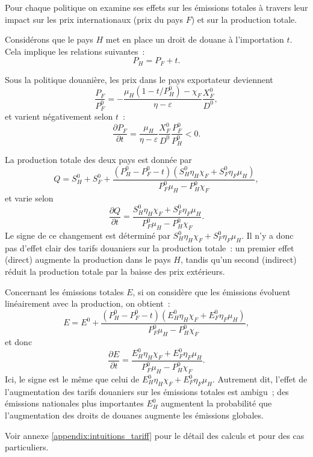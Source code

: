 Pour chaque politique on examine ses effets sur les émissions totales à travers leur impact sur les prix internationaux (prix du pays $F$) et sur la production totale.

Considérons que le pays $H$ met en place un droit de douane à l'importation $t$. Cela implique les relations suivantes~:
$$
    P_H = P_F + t.
$$

Sous la politique douanière, les prix dans le pays exportateur deviennent
$$
    \frac{P_F}{P_F^0} = -\frac{\mu_H (1 - t/P_H^0) - \chi_F}{\eta - \varepsilon}\frac{X_F^0}{D^0},
$$
et varient négativement selon $t$~:
$$
    \frac{\partial P_F}{\partial t} = \frac{\mu_H}{\eta - \varepsilon} \frac{X_F^0}{D^0} \frac{P_F^0}{P_H^0} < 0.
$$

La production totale des deux pays est donnée par
$$
    Q = S_H^0 + S_F^0 + \frac{(P_H^0 - P_F^0 - t)(S_H^0 \eta_H \chi_F + S_F^0 \eta_F \mu_H)}{P_F^0 \mu_H - P_H^0 \chi_F},
$$
et varie selon
$$
    \frac{\partial Q}{\partial t} = \frac{S_H^0 \eta_H \chi_F + S_F^0 \eta_F \mu_H}{P_F^0 \mu_H - P_H^0 \chi_F}.
$$
Le signe de ce changement est déterminé par $S_H^0 \eta_H \chi_F + S_F^0 \eta_F \mu_H$. Il n'y a donc pas d'effet clair des tarifs douaniers sur la production totale~: un premier effet (direct) augmente la production dans le pays $H$, tandis qu'un second (indirect) réduit la production totale par la baisse des prix extérieurs.

Concernant les émissions totales $E$, si on considère que les émissions évoluent linéairement avec la production, on obtient~:
$$
    E = E^0 + \frac{(P_H^0 - P_F^0 - t)(E_H^0 \eta_H \chi_F + E_F^0 \eta_F \mu_H)}{P_F^0 \mu_H - P_H^0 \chi_F},
$$
et donc
$$
    \frac{\partial E}{\partial t} = \frac{E_H^0 \eta_H \chi_F + E_F^0 \eta_F \mu_H}{P_F^0 \mu_H - P_H^0 \chi_F}.
$$
Ici, le signe est le même que celui de $E_H^0 \eta_H \chi_F + E_F^0 \eta_F \mu_H$. Autrement dit, l'effet de l'augmentation des tarifs douaniers sur les émissions totales est ambigu~; des émissions nationales plus importantes $E_H^0$ augmentent la probabilité que l'augmentation des droits de douanes augmente les émissions globales.

Voir annexe \ref{appendix:intuitions_tariff} pour le détail des calculs et pour des cas particuliers.
